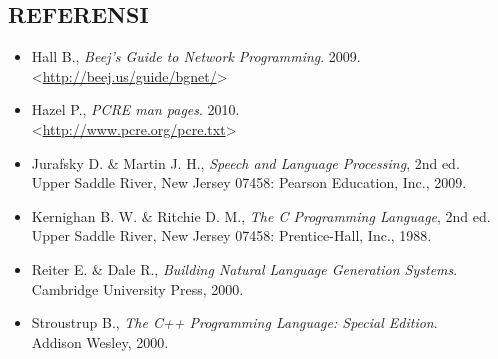 \subsection*{\textcolor{subsectioncolor}{\textsf{REFERENSI}}}
\begin{itemize}
\item Hall B., \emph{Beej's Guide to Network Programming}. 2009.\\
\textless\url{http://beej.us/guide/bgnet/}\textgreater
\item Hazel P., \emph{PCRE man pages}. 2010.\\
\textless\url{http://www.pcre.org/pcre.txt}\textgreater
\item Jurafsky D. \& Martin J. H., \emph{Speech and Language Processing}, 2nd ed.\\
Upper Saddle River, New Jersey 07458: Pearson Education, Inc., 2009.
\item Kernighan B. W. \& Ritchie D. M., \emph{The C Programming Language}, 2nd ed.\\
Upper Saddle River, New Jersey 07458: Prentice-Hall, Inc., 1988.
\item Reiter E. \& Dale R., \emph{Building Natural Language Generation Systems}.\\
Cambridge University Press, 2000.
\item Stroustrup B., \emph{The C++ Programming Language: Special Edition}.\\
Addison Wesley, 2000.

\end{itemize}
